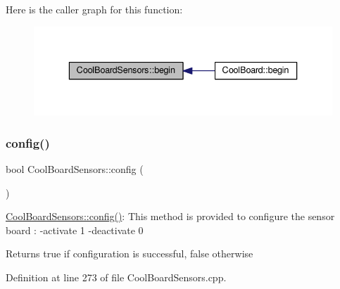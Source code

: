 Here is the caller graph for this function\+:\nopagebreak
\begin{figure}[H]
\begin{center}
\leavevmode
\includegraphics[width=336pt]{de/d46/class_cool_board_sensors_a97095823ef7c8f5290812f1405b966b3_icgraph}
\end{center}
\end{figure}
\mbox{\label{class_cool_board_sensors_a9a218895c5423375c33c08f2c56fb23a}} 
\subsubsection{\texorpdfstring{config()}{config()}}
{\footnotesize\ttfamily bool Cool\+Board\+Sensors\+::config (\begin{DoxyParamCaption}{ }\end{DoxyParamCaption})}

\hyperlink{class_cool_board_sensors_a9a218895c5423375c33c08f2c56fb23a}{Cool\+Board\+Sensors\+::config()}\+: This method is provided to configure the sensor board \+: -\/activate 1 -\/deactivate 0

\begin{DoxyReturn}{Returns}
true if configuration is successful, false otherwise 
\end{DoxyReturn}


Definition at line 273 of file Cool\+Board\+Sensors.\+cpp.



